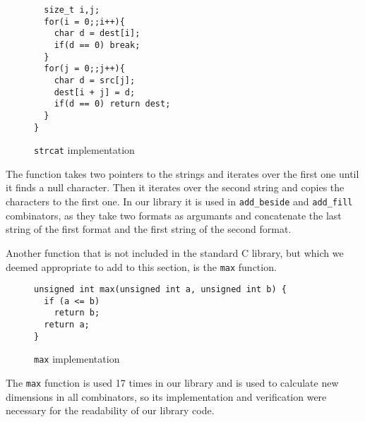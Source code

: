 \documentclass[14pt]{constructor-diploma}
\begin{document}
\begin{enumerate}
\begin{figure}[H]
\begin{mdframed}[backgroundcolor=bg]
\begin{verbatim}
  size_t i,j;
  for(i = 0;;i++){
    char d = dest[i];
    if(d == 0) break;
  }
  for(j = 0;;j++){
    char d = src[j];
    dest[i + j] = d;
    if(d == 0) return dest;
  }
}
      \end{verbatim}
      \end{mdframed}
      \caption{\texttt{strcat} implementation}
      \label{fig:strcat}
      \end{figure}
    The function takes two pointers to the strings and iterates over the first one until it finds a null character. 
    Then it iterates over the second string and copies the characters to the first one.
    In our library it is used in \texttt{add\_beside} and \texttt{add\_fill} combinators, as they take two
    formats as argumants and concatenate the last string of the first format and the first string of the second format.
\end{enumerate}
Another function that is not included in the standard C library, but which we deemed appropriate to add to this section, is the \texttt{max} function.
      \begin{figure}[H]
      \begin{mdframed}[backgroundcolor=bg]
      \begin{verbatim}
unsigned int max(unsigned int a, unsigned int b) {
  if (a <= b)
    return b;
  return a;
}
      \end{verbatim}
      \end{mdframed}
      \caption{\texttt{max} implementation}
      \label{fig:max}
      \end{figure}
  The \texttt{max} function is used 17 times in our library and is used to calculate new dimensions in all combinators, 
  so its implementation and verification were necessary for the readability of our library code.

\newpage
\end{document}
